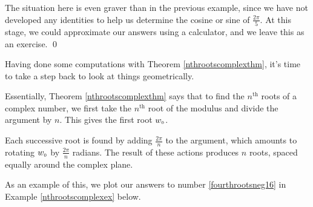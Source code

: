 \documentclass{ximera}
\begin{document}
\begin{example}
\begin{enumerate}
\smallskip

 The situation here is even graver than in the previous example, since we have not developed any identities to help us determine the cosine or sine of $\frac{2\pi}{5}$.  At this stage, we could approximate our answers using a calculator, and we leave this as an exercise. \qed

\end{enumerate}

\end{example}

Having done some computations with Theorem \ref{nthrootscomplexthm},  it's time to  take a step back to look at things geometrically.  

\smallskip

Essentially,  Theorem \ref{nthrootscomplexthm} says that to find the $n^{\text{th}}$ roots of a complex number,  we first take the $n^{\text{th}}$ root of the modulus and divide the argument by $n$.  This gives the first root  $w_{\text{\tiny$0$}}$. 

\smallskip

Each successive root is found by adding  $\frac{2\pi}{n}$ to the argument, which amounts to rotating $w_{\text{\tiny$0$}}$ by $\frac{2\pi}{n}$ radians. The result of these actions  produces $n$ roots, spaced equally around the complex plane.  

\smallskip

As an example of this, we plot our answers to number \ref{fourthrootsneg16} in Example \ref{nthrootscomplexex} below.
\end{document}
